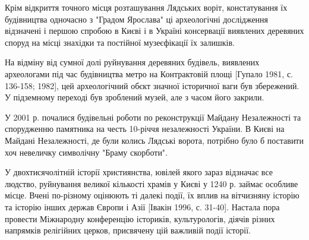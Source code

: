 Крім відкриття точного місця розташування Лядських воріт, констатування їх
будівництва одночасно з "Градом Ярослава" ці археологічні дослідження
відзначені і першою спробою в Києві і в Україні консервації виявлених деревяних
споруд на місці знахідки та постійної музеєфікації їх залишків.

На відміну від сумної долі руйнування деревяних будівель, виявлених
археологами під час будівництва метро на Контрактовій площі [Гупало 1981, с.
136-158; 1982], цей археологічний обєкт значної історичної ваги був
збережений. У підземному переході був зроблений музей, але з часом його
закрили.

У 2001 р. почалися будівельні роботи по реконструкції Майдану Незалежності та
спорудженню памятника на честь 10-річчя незалежності України. В Києві на
Майдані Незалежності, де були колись Лядські ворота, потрібно було б поставити
хоч невеличку символічну "Браму скорботи".

У двохтисячолітній історії християнства, ювілей якого зараз відзначає все
людство, руйнування великої кількості храмів у Києві у 1240 р. займає особливе
місце. Вчені по-різному оцінюють ті далекі події, їх вплив на вітчизняну
історію та історію інших держав Європи і Азії [Івакін 1996, с. 31-40]. Настала
пора провести Міжнародну конференцію істориків, культурологів, діячів різних
напрямків релігійних церков, присвячену цій важливій події історії.
